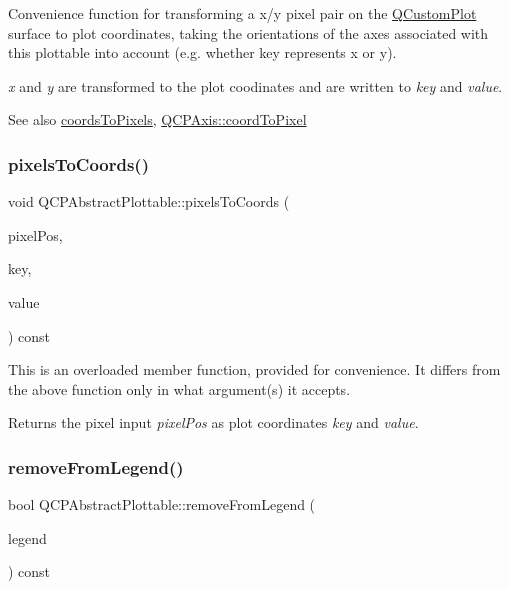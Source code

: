 Convenience function for transforming a x/y pixel pair on the \mbox{\hyperlink{class_q_custom_plot}{Q\+Custom\+Plot}} surface to plot coordinates, taking the orientations of the axes associated with this plottable into account (e.\+g. whether key represents x or y).

{\itshape x} and {\itshape y} are transformed to the plot coodinates and are written to {\itshape key} and {\itshape value}.

\begin{DoxySeeAlso}{See also}
\mbox{\hyperlink{class_q_c_p_abstract_plottable_a7ad84a36472441cf1f555c5683d0da93}{coords\+To\+Pixels}}, \mbox{\hyperlink{class_q_c_p_axis_af15d1b3a7f7e9b53d759d3ccff1fe4b4}{Q\+C\+P\+Axis\+::coord\+To\+Pixel}} 
\end{DoxySeeAlso}
\mbox{\label{class_q_c_p_abstract_plottable_a28d32c0062b9450847851ffdee1c5f69}} 
\subsubsection{\texorpdfstring{pixelsToCoords()}{pixelsToCoords()}\hspace{0.1cm}{\footnotesize\ttfamily [2/2]}}
{\footnotesize\ttfamily void Q\+C\+P\+Abstract\+Plottable\+::pixels\+To\+Coords (\begin{DoxyParamCaption}\item[{const Q\+PointF \&}]{pixel\+Pos,  }\item[{double \&}]{key,  }\item[{double \&}]{value }\end{DoxyParamCaption}) const}

This is an overloaded member function, provided for convenience. It differs from the above function only in what argument(s) it accepts.

Returns the pixel input {\itshape pixel\+Pos} as plot coordinates {\itshape key} and {\itshape value}. \mbox{\label{class_q_c_p_abstract_plottable_a3cc235007e2343a65ad4f463767e0e20}} 
\subsubsection{\texorpdfstring{removeFromLegend()}{removeFromLegend()}\hspace{0.1cm}{\footnotesize\ttfamily [1/2]}}
{\footnotesize\ttfamily bool Q\+C\+P\+Abstract\+Plottable\+::remove\+From\+Legend (\begin{DoxyParamCaption}\item[{\mbox{\hyperlink{class_q_c_p_legend}{Q\+C\+P\+Legend}} $\ast$}]{legend }\end{DoxyParamCaption}) const}

